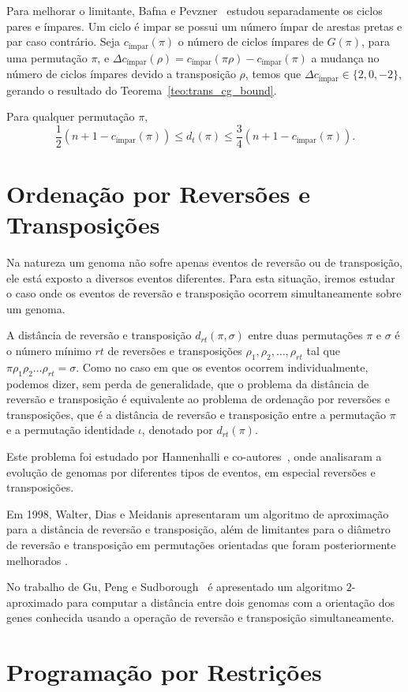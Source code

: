 Para melhorar o limitante, Bafna e Pevzner~\cite{BafnaPevzner*1998}
estudou separadamente os ciclos pares e ímpares. Um ciclo é impar se
possui um número ímpar de arestas pretas e par caso contrário. Seja
$c_{\text{ímpar}}(\pi)$ o número de ciclos ímpares de $G(\pi)$, para
uma permutação $\pi$, e $\Delta c_{\text{ímpar}} (\rho) =
c_{\text{ímpar}} (\pi \rho) - c_{\text{ímpar}} (\pi)$ a mudança no
número de ciclos ímpares devido a transposição $\rho$, temos que
$\Delta c_{\text{ímpar}} \in \{2, 0, -2\}$, gerando o resultado do
Teorema~\ref{teo:trans_cg_bound}.

\begin{teo} 
  \label{teo:trans_cg_bound} 
  Para qualquer permutação $\pi$, 
  \[ 
  \frac{1}{2}(n + 1 - c_{\text{ímpar}}(\pi)) \leq d_t(\pi) \leq \frac{3}{4} (n
  + 1 - c_{\text{ímpar}}(\pi)).
  \]
\end{teo}

\section{Ordenação por Reversões e Transposições}
\label{sec:rev_trans}
Na natureza um genoma não sofre apenas eventos de reversão ou de
transposição, ele está exposto a diversos eventos diferentes. Para
esta situação, iremos estudar o caso onde os eventos de reversão e
transposição ocorrem simultaneamente sobre um genoma.

A distância de reversão e transposição $d_{rt}(\pi, \sigma)$ entre
duas permutações $\pi$ e $\sigma$ é o número mínimo $rt$ de reversões
e transposições $\rho_{1}, \rho_{2}, \ldots, \rho_{rt}$ tal que
$\pi \rho_{1} \rho_{2} \ldots \rho_{rt} = \sigma$. Como no caso em que
os eventos ocorrem individualmente, podemos dizer, sem perda de
generalidade, que o problema da distância de reversão e transposição é
equivalente ao problema de ordenação por reversões e transposições,
que é a distância de reversão e transposição entre a permutação $\pi$ e a
permutação identidade $\iota$, denotado por $d_{rt}(\pi)$.

Este problema foi estudado por Hannenhalli e
co-autores~\cite{HannenhalliChappeyKooninPevzner*1995}, onde
analisaram a evolução de genomas por diferentes tipos de eventos, em
especial reversões e transposições. 

Em 1998, Walter, Dias e Meidanis \cite{WalterDiasMeidanis*1998}
apresentaram um algoritmo de aproximação para a distância de reversão
e transposição, além de limitantes para o diâmetro de reversão e
transposição em permutações orientadas que foram posteriormente
melhorados \cite{MeidanisWalterDias*2002}.

No trabalho de Gu, Peng e Sudborough~\cite{GuPengSudbourough*1999} é
apresentado um algoritmo $2$-aproximado para computar a distância
entre dois genomas com a orientação dos genes conhecida usando a
operação de reversão e transposição simultaneamente.

\section{Programação por Restrições}
\label{sec:def_cp}
